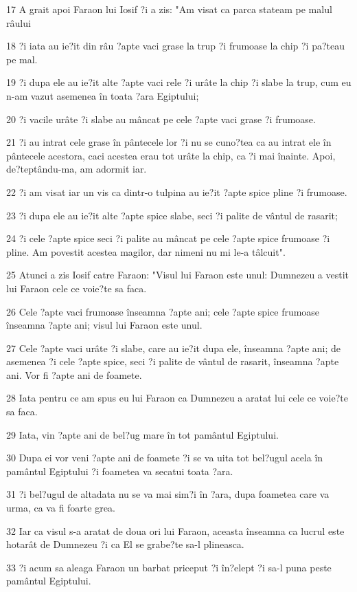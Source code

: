 \par 17 A grait apoi Faraon lui Iosif ?i a zis: "Am visat ca parca stateam pe malul râului
\par 18 ?i iata au ie?it din râu ?apte vaci grase la trup ?i frumoase la chip ?i pa?teau pe mal.
\par 19 ?i dupa ele au ie?it alte ?apte vaci rele ?i urâte la chip ?i slabe la trup, cum eu n-am vazut asemenea în toata ?ara Egiptului;
\par 20 ?i vacile urâte ?i slabe au mâncat pe cele ?apte vaci grase ?i frumoase.
\par 21 ?i au intrat cele grase în pântecele lor ?i nu se cuno?tea ca au intrat ele în pântecele acestora, caci acestea erau tot urâte la chip, ca ?i mai înainte. Apoi, de?teptându-ma, am adormit iar.
\par 22 ?i am visat iar un vis ca dintr-o tulpina au ie?it ?apte spice pline ?i frumoase.
\par 23 ?i dupa ele au ie?it alte ?apte spice slabe, seci ?i palite de vântul de rasarit;
\par 24 ?i cele ?apte spice seci ?i palite au mâncat pe cele ?apte spice frumoase ?i pline. Am povestit acestea magilor, dar nimeni nu mi le-a tâlcuit".
\par 25 Atunci a zis Iosif catre Faraon: "Visul lui Faraon este unul: Dumnezeu a vestit lui Faraon cele ce voie?te sa faca.
\par 26 Cele ?apte vaci frumoase înseamna ?apte ani; cele ?apte spice frumoase înseamna ?apte ani; visul lui Faraon este unul.
\par 27 Cele ?apte vaci urâte ?i slabe, care au ie?it dupa ele, înseamna ?apte ani; de asemenea ?i cele ?apte spice, seci ?i palite de vântul de rasarit, înseamna ?apte ani. Vor fi ?apte ani de foamete.
\par 28 Iata pentru ce am spus eu lui Faraon ca Dumnezeu a aratat lui cele ce voie?te sa faca.
\par 29 Iata, vin ?apte ani de bel?ug mare în tot pamântul Egiptului.
\par 30 Dupa ei vor veni ?apte ani de foamete ?i se va uita tot bel?ugul acela în pamântul Egiptului ?i foametea va secatui toata ?ara.
\par 31 ?i bel?ugul de altadata nu se va mai sim?i în ?ara, dupa foametea care va urma, ca va fi foarte grea.
\par 32 Iar ca visul s-a aratat de doua ori lui Faraon, aceasta înseamna ca lucrul este hotarât de Dumnezeu ?i ca El se grabe?te sa-l plineasca.
\par 33 ?i acum sa aleaga Faraon un barbat priceput ?i în?elept ?i sa-l puna peste pamântul Egiptului.
